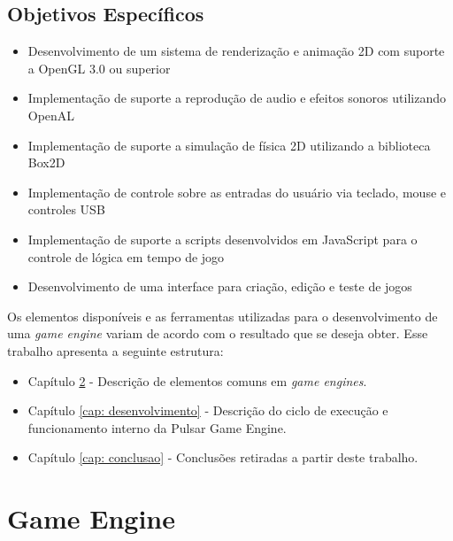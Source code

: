 \documentclass[12pt,	openright, twoside,	a4paper, english, french, spanish, brazil]{abntex2}
\begin{document}
%
%

\section{Objetivos Específicos}
\begin{itemize}
\item Desenvolvimento de um sistema de renderização e animação 2D com suporte a OpenGL 3.0 ou superior
\item Implementação de suporte a reprodução de audio e efeitos sonoros utilizando OpenAL
\item Implementação de suporte a simulação de física 2D utilizando a biblioteca Box2D
\item Implementação de controle sobre as entradas do usuário via teclado, mouse e controles USB
\item Implementação de suporte a scripts desenvolvidos em JavaScript para o controle de lógica em tempo de jogo
\item Desenvolvimento de uma interface para criação, edição e teste de jogos
\end{itemize}

Os elementos disponíveis e as ferramentas utilizadas para o desenvolvimento de uma \textit{game engine} variam de acordo com o resultado que se deseja obter. 
Esse trabalho apresenta a seguinte estrutura:

\begin{itemize}
\item Capítulo \ref{cap: gameEngine} - Descrição de elementos comuns em \textit{game engines}.
\item Capítulo \ref{cap: desenvolvimento} - Descrição do ciclo de execução e funcionamento interno da Pulsar Game Engine.
\item Capítulo \ref{cap: conclusao} - Conclusões retiradas a partir deste trabalho.
\end{itemize}

%
%

\chapter{Game Engine} \label{cap: gameEngine}

%
%
\end{document}
